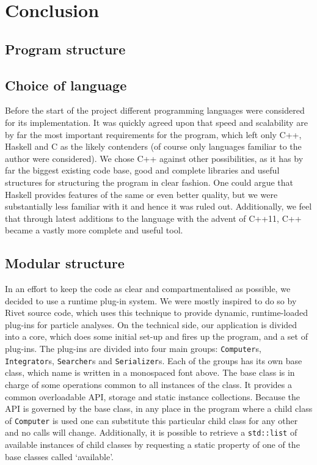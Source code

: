 \documentclass[11pt,a4paper]{article}
\begin{document}
\section{Conclusion}

\newpage



\newpage
\begin{appendices}
    \section{Program structure}\label{app:struct}
    \subsection{Choice of language}
    Before the start of the project different programming languages were considered for its implementation.
    It was quickly agreed upon that speed and scalability are by far the most important requirements for the program, which left only C++, Haskell and C as the likely contenders (of course only languages familiar to the author were considered).
    We chose C++ against other possibilities, as it has by far the biggest existing code base, good and complete libraries and useful structures for structuring the program in clear fashion.
    One could argue that Haskell provides features of the same or even better quality, but we were substantially less familiar with it and hence it was ruled out.
    Additionally, we feel that through latest additions to the language with the advent of C++11, C++ became a vastly more complete and useful tool.

    \subsection{Modular structure}
    In an effort to keep the code as clear and compartmentalised as possible, we decided to use a runtime plug-in system.
    We were mostly inspired to do so by Rivet\cite{Rivet13} source code, which uses this technique to provide dynamic, runtime-loaded plug-ins for particle analyses.
    On the technical side, our application is divided into a core, which does some initial set-up and fires up the program, and a set of plug-ins.
    The plug-ins are divided into four main groups: \texttt{Computer}s, \texttt{Integrator}s, \texttt{Searcher}s and \texttt{Serializer}s.
    Each of the groups has its own base class, which name is written in a monospaced font above.
    The base class is in charge of some operations common to all instances of the class.
    It provides a common overloadable API, storage and static instance collections.
    Because the API is governed by the base class, in any place in the program where a child class of \texttt{Computer} is used one can substitute this particular child class for any other and no calls will change.
    Additionally, it is possible to retrieve a \texttt{std::list} of available instances of child classes by requesting a static property of one of the base classes called `available'.


\end{appendices}
\end{document}

